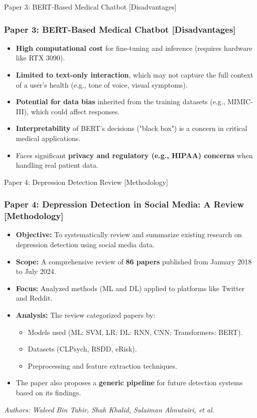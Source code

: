 \documentclass[11pt]{beamer}
\begin{document}
\begin{frame}{Paper 3: BERT-Based Medical Chatbot [Disadvantages]}
\frametitle{Paper 3: BERT-Based Medical Chatbot [Disadvantages]}
\begin{itemize}
    \item \textbf{High computational cost} for fine-tuning and inference (requires hardware like RTX 3090).
    \item \textbf{Limited to text-only interaction}, which may not capture the full context of a user's health (e.g., tone of voice, visual symptoms).
    \item \textbf{Potential for data bias} inherited from the training datasets (e.g., MIMIC-III), which could affect responses.
    \item \textbf{Interpretability} of BERT's decisions ("black box") is a concern in critical medical applications.
    \item Faces significant \textbf{privacy and regulatory (e.g., HIPAA) concerns} when handling real patient data.
\end{itemize}
\end{frame}

\begin{frame}{Paper 4: Depression Detection Review [Methodology]}
\frametitle{Paper 4: Depression Detection in Social Media: A Review [Methodology]}
\begin{itemize}
    \item \textbf{Objective:} To systematically review and summarize existing research on depression detection using social media data.
    \item \textbf{Scope:} A comprehensive review of \textbf{86 papers} published from January 2018 to July 2024.
    \item \textbf{Focus:} Analyzed methods (ML and DL) applied to platforms like Twitter and Reddit.
    \item \textbf{Analysis:} The review categorized papers by:
    \begin{itemize}
        \item Models used (ML: SVM, LR; DL: RNN, CNN; Transformers: BERT).
        \item Datasets (CLPsych, RSDD, eRisk).
        \item Preprocessing and feature extraction techniques.
    \end{itemize}
    \item The paper also proposes a \textbf{generic pipeline} for future detection systems based on its findings.
\end{itemize}
\vfill
\small{\textit{Authors: Waleed Bin Tahir, Shah Khalid, Sulaiman Almutairi, et al.}}
\end{frame}
\end{document}
